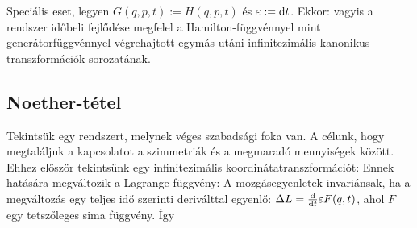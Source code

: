    Speciális eset, legyen $G(q,p,t):=H(q,p,t)$ és $\varepsilon:=\mathrm{d} t$. Ekkor:
   vagyis a rendszer időbeli fejlődése megfelel a Hamilton-függvénnyel mint generátorfüggvénnyel végrehajtott egymás utáni infinitezimális kanonikus transzformációk sorozatának. 
   
  \subsection{Noether-tétel}
   
   
   Tekintsük egy rendszert, melynek véges szabadsági foka van. A célunk, hogy megtaláljuk a kapcsolatot a szimmetriák és a megmaradó mennyiségek között. Ehhez először tekintsünk egy infinitezimális koordinátatranszformációt: 
   Ennek hatására megváltozik a Lagrange-függvény:
   A mozgásegyenletek invariánsak, ha a megváltozás egy teljes idő szerinti deriválttal egyenlő:
   $\Delta L=\frac{\mathrm{d} }{\mathrm{d} t}\varepsilon F(q,t)$, ahol $F$ egy tetszőleges sima függvény. Így
   
